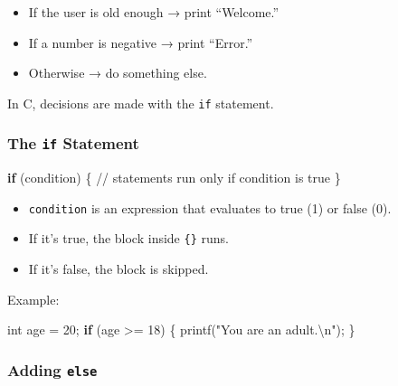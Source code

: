 \documentclass[
  letterpaper,
  DIV=11,
  numbers=noendperiod]{scrreprt}
\newenvironment{Shaded}{\begin{snugshade}}{\end{snugshade}}
\newcommand{\CommentTok}[1]{\textcolor[rgb]{0.37,0.37,0.37}{#1}}
\newcommand{\ControlFlowTok}[1]{\textcolor[rgb]{0.00,0.23,0.31}{\textbf{#1}}}
\newcommand{\DataTypeTok}[1]{\textcolor[rgb]{0.68,0.00,0.00}{#1}}
\newcommand{\DecValTok}[1]{\textcolor[rgb]{0.68,0.00,0.00}{#1}}
\newcommand{\NormalTok}[1]{\textcolor[rgb]{0.00,0.23,0.31}{#1}}
\newcommand{\OperatorTok}[1]{\textcolor[rgb]{0.37,0.37,0.37}{#1}}
\newcommand{\SpecialCharTok}[1]{\textcolor[rgb]{0.37,0.37,0.37}{#1}}
\newcommand{\StringTok}[1]{\textcolor[rgb]{0.13,0.47,0.30}{#1}}
\providecommand{\tightlist}{%
  \setlength{\itemsep}{0pt}\setlength{\parskip}{0pt}}
\begin{document}
\begin{itemize}
\tightlist
\item
  If the user is old enough → print ``Welcome.''
\item
  If a number is negative → print ``Error.''
\item
  Otherwise → do something else.
\end{itemize}

In C, decisions are made with the \texttt{if} statement.

\subsubsection{\texorpdfstring{The \texttt{if}
Statement}{The if Statement}}\label{the-if-statement}

\begin{Shaded}
\begin{Highlighting}[]
\ControlFlowTok{if} \OperatorTok{(}\NormalTok{condition}\OperatorTok{)} \OperatorTok{\{}
    \CommentTok{// statements run only if condition is true}
\OperatorTok{\}}
\end{Highlighting}
\end{Shaded}

\begin{itemize}
\tightlist
\item
  \texttt{condition} is an expression that evaluates to true (1) or
  false (0).
\item
  If it's true, the block inside \texttt{\{\}} runs.
\item
  If it's false, the block is skipped.
\end{itemize}

Example:

\begin{Shaded}
\begin{Highlighting}[]
\DataTypeTok{int}\NormalTok{ age }\OperatorTok{=} \DecValTok{20}\OperatorTok{;}
\ControlFlowTok{if} \OperatorTok{(}\NormalTok{age }\OperatorTok{\textgreater{}=} \DecValTok{18}\OperatorTok{)} \OperatorTok{\{}
\NormalTok{    printf}\OperatorTok{(}\StringTok{"You are an adult.}\SpecialCharTok{\textbackslash{}n}\StringTok{"}\OperatorTok{);}
\OperatorTok{\}}
\end{Highlighting}
\end{Shaded}

\subsubsection{\texorpdfstring{Adding
\texttt{else}}{Adding else}}\label{adding-else}
\end{document}
